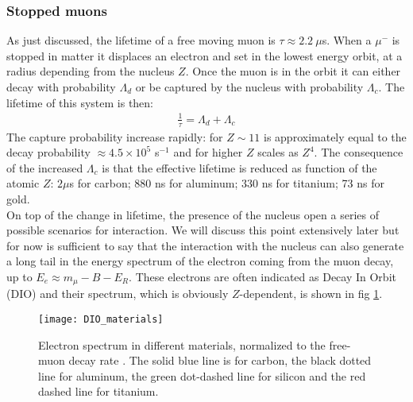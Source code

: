 \documentclass[12pt,a4paper,openright, oneside, titlepage]{book} %
\begin{document}
\subsubsection{Stopped muons}
\label{stopped_muon}
As just discussed, the lifetime of a free moving muon is $\tau\approx 2.2\ \mu$s. When a $\mu^-$ is stopped in matter it displaces an electron and set in the lowest energy orbit, at a radius depending from the nucleus $Z$. Once the muon is in the orbit it can either decay with probability $\Lambda_d$ or be captured by the nucleus with probability $\Lambda_c$. The lifetime of this system is then:
\begin{align}
\frac{1}{\tau}=\Lambda_d + \Lambda_c \label{eq_tau}
\end{align}
The capture probability increase rapidly: for $Z\sim 11$ is approximately equal to the decay probability $\approx 4.5 \times 10^5$ s$^{-1}$ and for higher $Z$ scales as $Z^4$.
The consequence of the increased $\Lambda_c$ is that the effective lifetime is reduced as function of the atomic $Z$: $2 \mu$s for carbon; $880$ ns for aluminum; $330$ ns for titanium; 73 ns for gold.\\
On top of the change in lifetime, the presence of the nucleus open a series of possible scenarios for interaction. We will discuss this point extensively later but for now is sufficient to say that the interaction with the nucleus can also generate a long tail in the energy spectrum of the electron coming from the muon decay, up to $E_e\approx m_\mu -B -E_R$. These electrons are often indicated as Decay In Orbit (DIO) and their spectrum, which is obviously $Z$-dependent, is shown in fig \ref{_DIO_pre}.\\

\begin{figure}[h!]
\centering
\texttt{[image: DIO\_materials]}
\caption{Electron spectrum in different materials, normalized to the free-muon decay rate \cite{signorelli}. The solid blue line is for carbon, the black dotted line for aluminum, the green dot-dashed line for silicon and the red dashed line for titanium.}
\label{_DIO_pre}
\end{figure}
\end{document}
